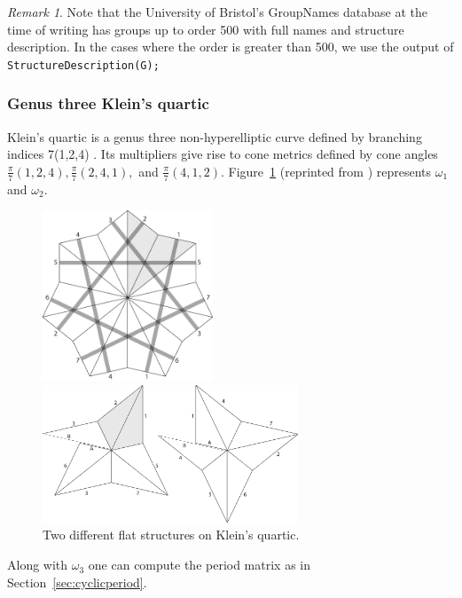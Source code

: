 \documentclass[12pt,reqno]{amsart}
\theoremstyle{definition}
\theoremstyle{remark}
\newtheorem*{remark}{Remark}
\begin{document}
\begin{remark} Note that the University of Bristol's GroupNames database at the time of writing has groups up to order 500 with full names and structure description. In the cases where the order is greater than 500, we use the output of \texttt{StructureDescription(G);} \end{remark}

\subsubsection{Genus three Klein's quartic}
Klein's quartic is a genus three non-hyperelliptic curve defined by branching indices 7(1,2,4) \cite{kw}. Its multipliers give rise to cone metrics defined by cone angles $\frac{\pi}{7}(1,2,4), \frac{\pi}{7}(2,4,1),$ and $\frac{\pi}{7}(4,1,2).$ Figure~\ref{fig:124} (reprinted from \cite{kw}) represents $\omega_1$ and $\omega_2.$

\begin{figure}[htbp] 
\centering
\begin{minipage}{0.5\textwidth}
  \centering
  \includegraphics[width=2in]{figures/124_flat.pdf}
\end{minipage}%
\begin{minipage}{0.5\textwidth}
  \centering
  \includegraphics[width=3in]{figures/124_flat_2.pdf}
\end{minipage}
  \caption{Two different flat structures on Klein's quartic.}
  \label{fig:124}
\end{figure}

Along with $\omega_3$ one can compute the period matrix as in Section~\ref{sec:cyclicperiod}.
\end{document}

